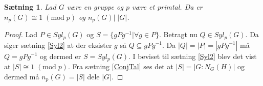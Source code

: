 \documentclass{article}
\newcommand{\inv}{^{-1}}
\newcommand{\ud}[1]{}
\newtheorem{setn}{Sætning}
\newtheorem{defi}{Definition}
\begin{document}
		\begin{setn} \label{Syl3}
			Lad $G$ være en gruppe og $p$ være et primtal.
			Da er $n_p(G) \cong 1 \; (\mathrm{mod}\; p)$ og $n_p(G) \big| \; |G|$.
		\end{setn}
		\begin{proof}
			Lad $P \in Syl_p(G)$ og $S = \{gPg\inv| \forall g \in P\}$. Betragt nu $Q \in Syl_p(G)$.
			Da siger sætning \ref{Syl2} at der eksister $g$ så $Q \subseteq gPg\inv$.
			Da $|Q| = |P| = |gPg\inv|$ må $Q = gPg\inv$ og dermed er $S = Syl_p(G)$.
			I beviset til sætning \ref{Syl2} blev det vist at $|S| \cong 1  \; (\mathrm{mod}\; p)$.
			Fra sætning \ref{ConjTal} ses det at $|S| = |G:N_G(H)|$ og dermed
			må $n_p(G) = |S|$ dele $|G|$.
		\end{proof}
	\ud{
		\subsection*{Opsamling}
		\subsection*{Definitioner}
		\subsection*{Sætninger}
		\subsection*{Vis selv}
	\section*{Til senere}
		\begin{defi}
			En tupel $(R,+,\cdot)$ med en mængde $R$ og binære operationer $+, \cdot$
			kaldes en ring hvis:

			(1) $(R,+)$ er en gruppe hvor neutral elementet kaldes $0$.

			(2) $\cdot$ er en acosiativ operation.

			(3) $\cdot$ distribuere over $+$ alstå $\forall a,b,c \in R: a*(b+c)=a*b+a*c$
			og $(a+b)*c = a*c+b*c$.
		\end{defi}
	\section*{Til senere}
	}
\end{document}
